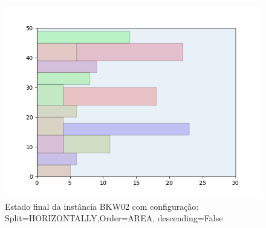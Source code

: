 \begin{figure}[H]
    \centering
    \caption[]{Estado final da instância BKW02 com configuração: Split=HORIZONTALLY,Order=AREA, descending=False}
    \label{fig:bkw02-horizontally-area-false}
    \includegraphics[scale=0.5]{output/figures/bkw/bkw02/horizontally/area/false/00}
\end{figure}